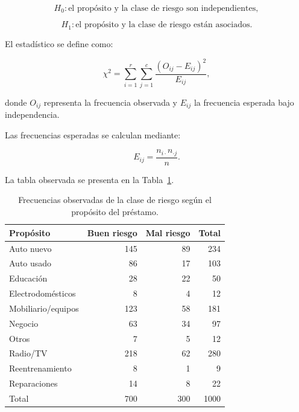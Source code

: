 \[
H_0:
\text{el propósito y la clase de riesgo son independientes},
\]

\[
H_1:
\text{el propósito y la clase de riesgo están asociados}.
\]

El estadístico se define como:

\[
\chi^2
=
\sum_{i=1}^{r}
\sum_{j=1}^{c}
\frac{
    \left(O_{ij}-E_{ij}\right)^2
}{
    E_{ij}
},
\]

donde \(O_{ij}\) representa la frecuencia observada y \(E_{ij}\) la
frecuencia esperada bajo independencia.

Las frecuencias esperadas se calculan mediante:

\[
E_{ij}
=
\frac{
    n_{i\cdot}n_{\cdot j}
}{
    n
}.
\]

La tabla observada se presenta en la
Tabla~\ref{tab:contingencia-proposito}.

\begin{table}[H]
    \centering
    \caption{Frecuencias observadas de la clase de riesgo según el
    propósito del préstamo.}
    \label{tab:contingencia-proposito}

    \begin{tabular}{
        @{}
        l
        r
        r
        r
        @{}
    }
        \toprule
        Propósito
        & Buen riesgo
        & Mal riesgo
        & Total \\
        \midrule

        Auto nuevo
        & 145
        & 89
        & 234 \\

        Auto usado
        & 86
        & 17
        & 103 \\

        Educación
        & 28
        & 22
        & 50 \\

        Electrodomésticos
        & 8
        & 4
        & 12 \\

        Mobiliario/equipos
        & 123
        & 58
        & 181 \\

        Negocio
        & 63
        & 34
        & 97 \\

        Otros
        & 7
        & 5
        & 12 \\

        Radio/TV
        & 218
        & 62
        & 280 \\

        Reentrenamiento
        & 8
        & 1
        & 9 \\

        Reparaciones
        & 14
        & 8
        & 22 \\

        \midrule
        Total
        & 700
        & 300
        & 1000 \\

        \bottomrule
    \end{tabular}
\end{table}

